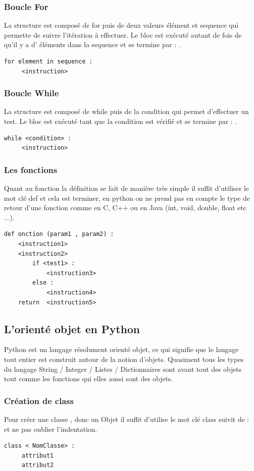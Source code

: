 \documentclass[a4paper, 12pt, twoside]{article}
\begin{document}
\subsubsection{ Boucle For}
La structure est composé de for puis de deux valeurs élément et sequence qui permette de suivre l'itération à effectuer. Le bloc est exécuté autant de fois de qu'il y a d' éléments dans la sequence et se termine par  : .
\begin{verbatim}
for element in sequence :
     <instruction>
\end{verbatim}
\subsubsection{ Boucle While }
La structure est composé de while puis de la condition qui permet d'effectuer un test. Le bloc est exécuté tant que la condition est vérifié et se termine par  : .
\begin{verbatim}
while <condition> :
     <instruction>
\end{verbatim}
\subsubsection{ Les fonctions}
Quant au fonction la définition se fait de manière très simple il suffit d'utiliser le mot clé def et cela est terminer, en python on ne prend pas en compte le type de retour d'une fonction comme en C, C++ ou en Java (int, void, double, float etc ...).
\begin{verbatim}
def onction (param1 , param2) :
    <instruction1>
    <instruction2>
        if <test1> :
            <instruction3>
        else :
            <instruction4>
    return  <instruction5>
\end{verbatim}

\subsection{L'orienté objet en Python}
Python est un langage résolument orienté objet, ce qui signifie que le langage tout entier est construit autour de la notion d’objets. Quasiment tous les types du langage String / Integer / Listes / Dictionnaires  sont avant tout des objets tout comme les fonctions qui elles aussi sont des objets.

\subsubsection{Création de class}{Pour créer une classe , donc un Objet il suffit d'utilise le mot clé class suivit de  :  et ne pas oublier l'indentation.}
\begin{verbatim}
class < NomClasse> : 
     attribut1
     attribut2 
\end{verbatim}
\end{document}
